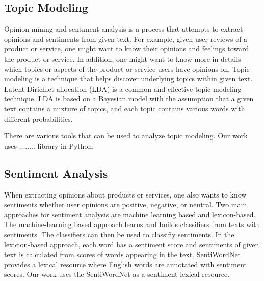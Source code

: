 

\subsection{Topic Modeling}

Opinion mining and sentiment analysis is a process that attempts to extract opinions and sentiments from given text\cite{surveyopinionmining}. For example, given user reviews of a product or service, one might want to know their opinions and feelings toward the product or service. In addition, one might want to know more in details which topics or aspects of the product or service users have opinions on. Topic modeling is a technique that helps discover underlying topics within given text. Latent Dirichlet allocation (LDA)\cite{LDA} is a common and effective topic modeling technique. LDA is based on a Bayesian model with the assumption that a given text contains a mixture of topics, and each topic contains various words with different probabilities.

There are various tools that can be used to analyze topic modeling. Our work uses ........ library in Python.

\subsection{Sentiment Analysis}

When extracting opinions about products or services, one also wants to know sentiments whether user opinions are positive, negative, or neutral. Two main approaches for sentiment analysis are machine learning based and lexicon-based. The machine-learning based approach learns and builds classifiers from texts with sentiments. The classifiers can then be used to classifiy sentiments. In the lexicion-based approach, each word has a sentiment score and sentiments of given text is calculated from scores of words appearing in the text. SentiWordNet~\cite{SentiWordNet} provides a lexical resource where English words are annotated with sentiment scores. Our work uses the SentiWordNet as a sentiment lexical resource.













